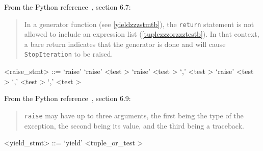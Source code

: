 From the Python reference~\cite{pythonlang}, section 6.7:
\begin{quote}
In a generator function (see \ref{yieldzzzstmtb}), 
the \verb|return| statement is not allowed to include an expression list (\ref{tuplezzzorzzztestb}). In that context, a bare return indicates that the generator is done and will cause \verb|StopIteration| to be raised.
\end{quote}

\label{raisezzzstmtb}

\begin{grammar}
<raise_stmt> ::= `raise'
	\alt `raise' <test \myref[testb]>
	\alt `raise' <test \myref[testb]> `,' <test \myref[testb]>
	\alt `raise' <test \myref[testb]> `,' <test \myref[testb]> `,' <test \myref[testb]>
\end{grammar}


From the Python reference~\cite{pythonlang}, section 6.9:
\begin{quote}
\verb|raise| may have up to three arguments, the first being the type of the exception,
the second being its value, and the third being a traceback.
\end{quote}

\label{yieldzzzstmtb}

\begin{grammar}
<yield_stmt> ::= `yield' <tuple_or_test \myref[tuplezzzorzzztestb]>
\end{grammar}


